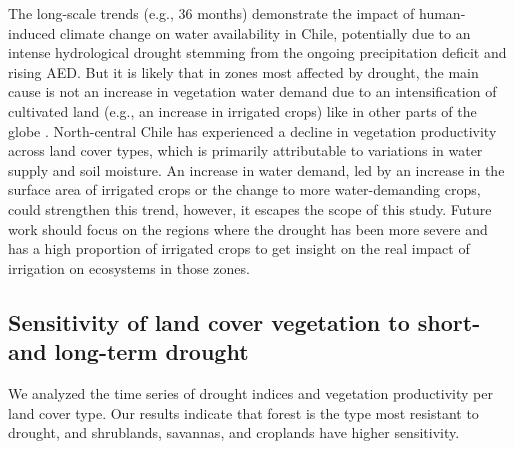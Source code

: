 \documentclass[
  authoryear,
  preprint,
  3p,
  onecolumn]{elsarticle}
\begin{document}
The long-scale trends (e.g., 36 months) demonstrate the impact of
human-induced climate change on water availability in Chile, potentially
due to an intense hydrological drought stemming from the ongoing
precipitation deficit and rising AED. But it is likely that in zones
most affected by drought, the main cause is not an increase in
vegetation water demand due to an intensification of cultivated land
(e.g., an increase in irrigated crops) like in other parts of the globe
\citep{Vicente-Serrano2020}. North-central Chile has experienced a
decline in vegetation productivity across land cover types, which is
primarily attributable to variations in water supply and soil moisture.
An increase in water demand, led by an increase in the surface area of
irrigated crops or the change to more water-demanding crops, could
strengthen this trend, however, it escapes the scope of this study.
Future work should focus on the regions where the drought has been more
severe and has a high proportion of irrigated crops to get insight on
the real impact of irrigation on ecosystems in those zones.

\hypertarget{sensitivity-of-land-cover-vegetation-to-short--and-long-term-drought}{%
\subsection{Sensitivity of land cover vegetation to short- and long-term
drought}\label{sensitivity-of-land-cover-vegetation-to-short--and-long-term-drought}}

We analyzed the time series of drought indices and vegetation
productivity per land cover type. Our results indicate that forest is
the type most resistant to drought, and shrublands, savannas, and
croplands have higher sensitivity.
\end{document}
